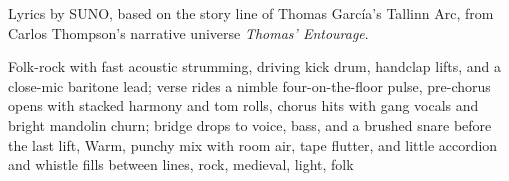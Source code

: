 
\begin{notes}
Lyrics by SUNO, based on the story line of Thomas García's Tallinn Arc, from Carlos Thompson's narrative universe \emph{Thomas’ Entourage}.
\end{notes}
\begin{style}
Folk-rock with fast acoustic strumming, driving kick drum, handclap lifts, and a close-mic baritone lead; verse rides a nimble four-on-the-floor pulse, pre-chorus opens with stacked harmony and tom rolls, chorus hits with gang vocals and bright mandolin churn; bridge drops to voice, bass, and a brushed snare before the last lift, Warm, punchy mix with room air, tape flutter, and little accordion and whistle fills between lines, rock, medieval, light, folk
\end{style}
